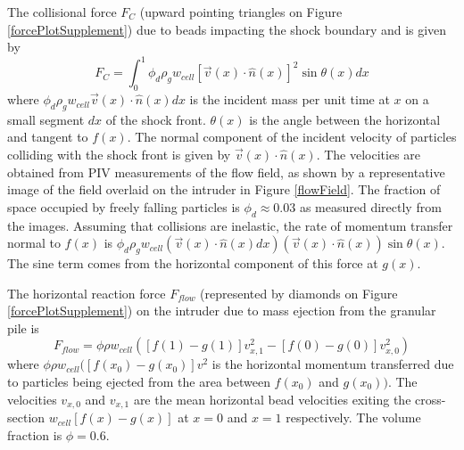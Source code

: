 The collisional force $F_{C}$ (upward pointing triangles on Figure \ref{forcePlotSupplement}) due to beads impacting the shock boundary and is given by 
\begin{equation} 
F_{C} = \int_0^1 \phi_{d}\rho_{g}w_{cell} [\vec{v}(x)\cdot \hat{n}(x)]^{2} \sin{\theta(x)}dx
\label{fcollision}
\end{equation}
where $\phi_{d}\rho_{g}w_{cell} \vec{v}(x)\cdot \hat{n}(x)dx$ is the incident mass per unit time at $x$ on a small segment $dx$ of the shock front. $\theta(x)$ is the angle between the horizontal and tangent to $f(x)$.  The normal component of the incident velocity of particles colliding with the shock front is given by $\vec{v}(x)\cdot \hat{n}(x)$. The velocities are obtained from PIV measurements of the flow field, as shown by a representative image of the field overlaid on the intruder in Figure \ref{flowField}. The fraction of space occupied by freely falling particles is $\phi_{d}\approx0.03$ as measured directly from the images. Assuming that collisions are inelastic, the rate of momentum transfer normal to $f(x)$ is $\phi_{d}\rho_{g}w_{cell} \left(\vec{v}(x)\cdot \hat{n}(x)dx \right) \left(\vec{v}(x)\cdot \hat{n}(x)\right)\sin\theta(x)$. The sine term comes from the horizontal component of this force at $g(x)$.

The horizontal reaction force $F_{flow}$ (represented by diamonds on Figure \ref{forcePlotSupplement}) on the intruder due to mass ejection from the granular pile  is 
\begin{equation} 
F_{flow} =  \phi \rho w_{cell} \left( \left[ f(1)-g(1) \right] v_{x,1}^{2} - \left[ f(0)-g(0) \right] v_{x,0}^{2} \right)
\label{fflow}
\end{equation}
where $\phi \rho w_{cell}([f(x_0)-g(x_0)] v^{2}$ is the horizontal momentum transferred due to particles being ejected from the area between $f(x_0)$ and $g(x_0))$. The velocities $v_{x,0}$ and $v_{x,1}$ are the mean horizontal bead velocities exiting the cross-section $w_{cell}[f(x)-g(x)]$ at $x=0$ and $x=1$ respectively. The volume fraction is $\phi=0.6$. 


